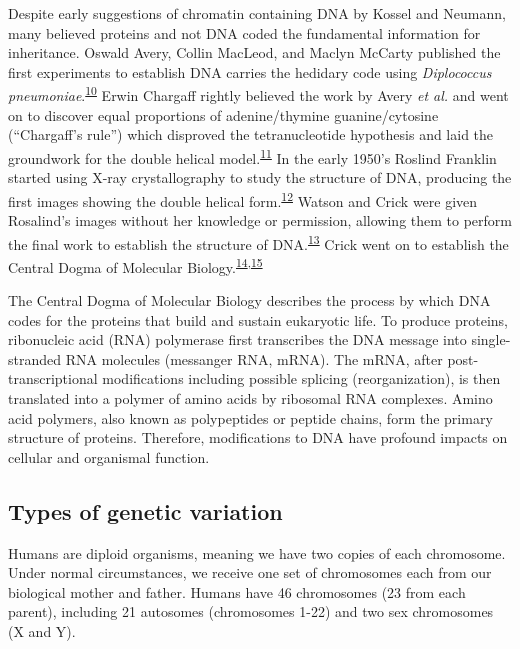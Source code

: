 \documentclass[11pt,letterpaper]{book}
\begin{document}
Despite early suggestions of chromatin containing DNA by Kossel and Neumann, many believed proteins and not DNA coded the fundamental information for inheritance.
Oswald Avery, Collin MacLeod, and Maclyn McCarty published the first experiments to establish DNA carries the hedidary code using \emph{Diplococcus pneumoniae}.\textsuperscript{\protect\hyperlink{ref-avery:1944aa}{10}}
Erwin Chargaff rightly believed the work by Avery \emph{et al.} and went on to discover equal proportions of adenine/thymine guanine/cytosine (``Chargaff's rule'') which disproved the tetranucleotide hypothesis and laid the groundwork for the double helical model.\textsuperscript{\protect\hyperlink{ref-chargaff:1949aa}{11}}
In the early 1950's Roslind Franklin started using X-ray crystallography to study the structure of DNA, producing the first images showing the double helical form.\textsuperscript{\protect\hyperlink{ref-franklin:1953aa}{12}}
Watson and Crick were given Rosalind's images without her knowledge or permission, allowing them to perform the final work to establish the structure of DNA.\textsuperscript{\protect\hyperlink{ref-watson:1953aa}{13}}
Crick went on to establish the Central Dogma of Molecular Biology.\textsuperscript{\protect\hyperlink{ref-crick:1958aa}{14},\protect\hyperlink{ref-crick:1970aa}{15}}

The Central Dogma of Molecular Biology describes the process by which DNA codes for the proteins that build and sustain eukaryotic life.
To produce proteins, ribonucleic acid (RNA) polymerase first transcribes the DNA message into single-stranded RNA molecules (messanger RNA, mRNA).
The mRNA, after post-transcriptional modifications including possible splicing (reorganization), is then translated into a polymer of amino acids by ribosomal RNA complexes.
Amino acid polymers, also known as polypeptides or peptide chains, form the primary structure of proteins.
Therefore, modifications to DNA have profound impacts on cellular and organismal function.

\hypertarget{types-of-genetic-variation}{%
\subsection{Types of genetic variation}\label{types-of-genetic-variation}}

Humans are diploid organisms, meaning we have two copies of each chromosome.
Under normal circumstances, we receive one set of chromosomes each from our biological mother and father.
Humans have 46 chromosomes (23 from each parent), including 21 autosomes (chromosomes 1-22) and two sex chromosomes (X and Y).
\end{document}
